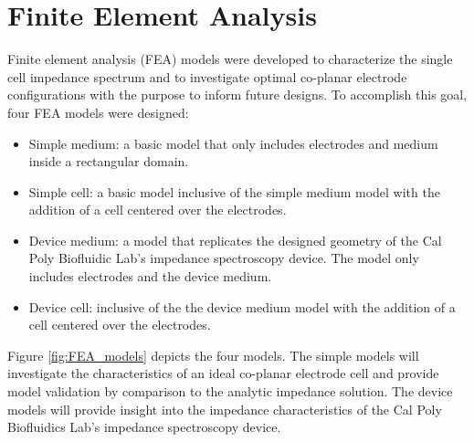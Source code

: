 \section{Finite Element Analysis}

\par Finite element analysis (FEA) models were developed to characterize the single cell impedance spectrum and to investigate optimal co-planar electrode configurations with the purpose to inform future designs. To accomplish this goal, four FEA models were designed:

\begin{itemize}
    \item Simple medium: a basic model that only includes electrodes and medium inside a rectangular domain.
    \item Simple cell: a basic model inclusive of the simple medium model with the addition of a cell centered over the electrodes.
    \item Device medium: a model that replicates the designed geometry of the Cal Poly Biofluidic Lab's impedance spectroscopy device. The model only includes electrodes and the device medium.   
    \item Device cell: inclusive of the the device medium model with the addition of a cell centered over the electrodes. 
\end{itemize}

\par Figure \ref{fig:FEA_models} depicts the four models. The simple models will investigate the characteristics of an ideal co-planar electrode cell and provide model validation by comparison to the analytic impedance solution. The device models will provide insight into the impedance characteristics of the Cal Poly Biofluidics Lab's impedance spectroscopy device. 

